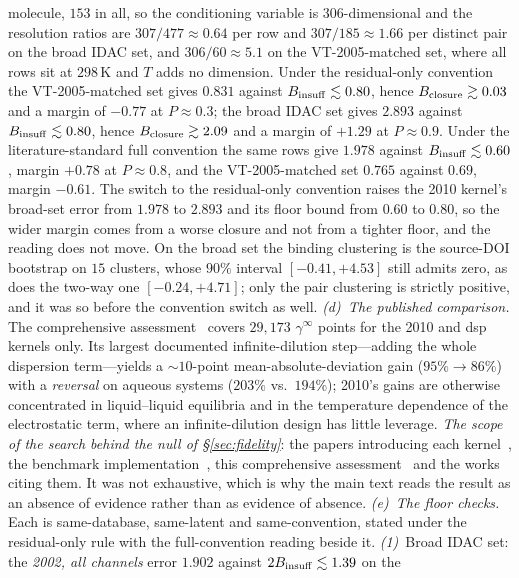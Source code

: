 molecule, $153$ in all, so the conditioning variable is $306$-dimensional and the resolution ratios
are $307/477\approx0.64$ per row and $307/185\approx1.66$ per distinct pair on the broad IDAC set,
and $306/60\approx5.1$ on the VT-2005-matched set, where all rows sit at $298$\,K and $T$ adds no dimension. Under
the residual-only convention the VT-2005-matched set gives $0.831$ against $B_{\mathrm{insuff}}\lesssim0.80$, hence
$B_{\mathrm{closure}}\gtrsim0.03$ and a margin of $-0.77$ at $P\approx0.3$; the broad IDAC set gives $2.893$
against $B_{\mathrm{insuff}}\lesssim0.80$, hence $B_{\mathrm{closure}}\gtrsim2.09$ and a margin of $+1.29$ at $P\approx0.9$.
Under the literature-standard full convention the same rows give $1.978$ against
$B_{\mathrm{insuff}}\lesssim0.60$, margin $+0.78$ at $P\approx0.8$, and the VT-2005-matched set $0.765$ against $0.69$, margin
$-0.61$. The switch to the residual-only convention raises the 2010 kernel's broad-set error from
$1.978$ to $2.893$ and its floor bound from $0.60$ to $0.80$, so the wider margin comes from a
worse closure and not from a tighter floor, and the reading does not move. On the broad set the binding
clustering is the source-DOI bootstrap on $15$ clusters, whose $90\%$ interval $[-0.41,+4.53]$ still
admits zero, as does the two-way one $[-0.24,+4.71]$; only the pair clustering is strictly positive,
and it was so before the convention switch as well. \emph{(d)~The published comparison.} The
comprehensive assessment~\cite{fingerhut2017} covers $29{,}173$ $\gamma^\infty$ points for the 2010
and dsp kernels only. Its largest documented infinite-dilution step---adding the whole dispersion
term---yields a ${\sim}10$-point mean-absolute-deviation gain ($95\%\to86\%$) with a \emph{reversal}
on aqueous systems ($203\%$ vs.\ $194\%$); 2010's gains are otherwise concentrated in
liquid--liquid equilibria and in the temperature dependence of the electrostatic term, where an
infinite-dilution design has little leverage. \emph{The scope of the search behind the null of
\S\ref{sec:fidelity}}: the papers introducing each
kernel~\cite{lin2002,hsieh2010,hsieh2014dsp}, the benchmark
implementation~\cite{bell2020cosmosac}, this comprehensive assessment~\cite{fingerhut2017} and the
works citing them. It was not exhaustive, which is why the main text reads the result as an absence
of evidence rather than as evidence of absence.
\emph{(e)~The floor checks.} Each is same-database, same-latent and same-convention,
stated under the residual-only rule with the full-convention reading beside it.
\emph{(1)}~Broad IDAC set: the \emph{2002, all channels} error $1.902$ against $2B_{\mathrm{insuff}}\lesssim1.39$ on the
